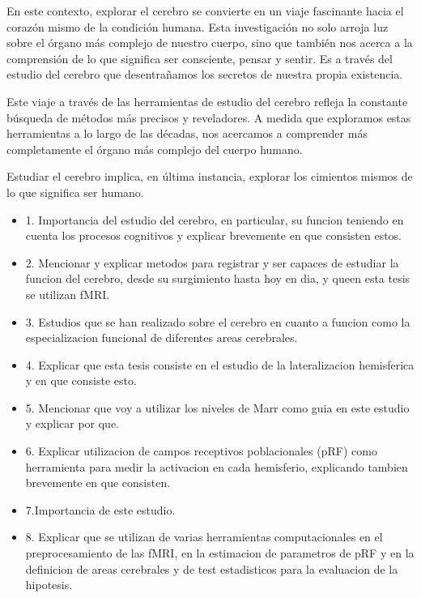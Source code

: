 \documentclass[12pt,oneside]{uhthesis}
\begin{document}
En este contexto, explorar el cerebro se convierte en un viaje fascinante hacia el corazón mismo de la condición humana. Esta investigación no solo arroja luz sobre el órgano más complejo de nuestro cuerpo, sino que también nos acerca a la comprensión de lo que significa ser consciente, pensar y sentir. Es a través del estudio del cerebro que desentrañamos los secretos de nuestra propia existencia.





Este viaje a través de las herramientas de estudio del cerebro refleja la constante búsqueda de métodos más precisos y reveladores. A medida que exploramos estas herramientas a lo largo de las décadas, nos acercamos a comprender más completamente el órgano más complejo del cuerpo humano.

 Estudiar el cerebro implica, en última instancia, explorar los cimientos mismos de lo que significa ser humano.

\begin{itemize}
	\item 1. Importancia del estudio del cerebro, en particular, su funcion teniendo en cuenta los procesos cognitivos y explicar brevemente en que consisten estos.
	\item 2. Mencionar y explicar metodos para registrar y ser capaces de estudiar la funcion del cerebro, desde su surgimiento hasta hoy en dia, y queen esta tesis se utilizan fMRI.
	\item 3. Estudios que se han realizado sobre el cerebro en cuanto a funcion como la especializacion funcional de diferentes areas cerebrales.
	\item 4. Explicar que esta tesis consiste en el estudio de la lateralizacion hemisferica y en que consiste esto.
	\item 5. Mencionar que voy a utilizar los niveles de Marr como guia en este estudio y explicar por que. 
	\item 6. Explicar utilizacion de campos receptivos poblacionales (pRF) como herramienta para medir la activacion en cada hemisferio, explicando tambien brevemente en que consisten. 
	\item 7.Importancia de este estudio.
	\item 8. Explicar que se utilizan de varias herramientas computacionales  en el preprocesamiento de las fMRI, en la estimacion de parametros de pRF y en la definicion de areas cerebrales y de test estadisticos para la evaluacion de la hipotesis.
\end{itemize}
\end{document}
